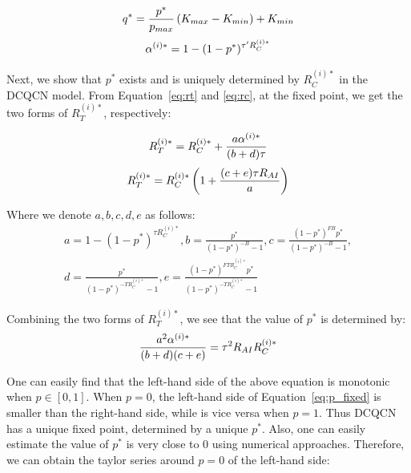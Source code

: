 \begin{equation}
\small
{q^*} = \frac{{{p^*}}}{{{p_{max}}}}\left( {{K_{max}} - {K_{min}}} \right) + {K_{min}}
\end{equation}
\begin{equation}
\small
\alpha^{(i)*}  = 1 - {(1 - p^*)^{{\tau '}R_C^{(i)*}}}
\end{equation}

Next, we show that $p^*$ exists and is uniquely determined by $R_C^{(i)*}$ in the DCQCN model. 
From Equation~\ref{eq:rt} and \ref{eq:rc}, at the fixed point, we get the two forms of $R_T^{(i)*}$, respectively:

\begin{equation}
\small
{R_T^{(i)*}} = R_C^{(i)*} + \frac{{a\alpha^{(i)*} }}{{(b + d)\tau }}
\end{equation}
\begin{equation}
\small
{R_T^{(i)*}} = R_C^{(i)*}\left( {1 + \frac{{(c + e)\tau {R_{AI}}}}{a}} \right)
\end{equation}

Where we denote $a, b, c, d, e$ as follows:
\begin{equation}
\begin{array}{l}
a = 1 - {(1 - p^*)^{\tau {R_C^{(i)*}}}},b = \frac{{p^*}}{{{{(1 - p^*)}^{ - B}} - 1}},c = \frac{{{{(1 - p^*)}^{FB}}p^*}}{{{{(1 - p^*)}^{ - B}} - 1}},\\
d = \frac{{p^*}}{{{{(1 - p^*)}^{ - T{R_C^{(i)*}}}} - 1}},e = \frac{{{{(1 - p^*)}^{FT{R_C^{(i)*}}}}p^*}}{{{{(1 - p^*)}^{ - T{R_C^{(i)*}}}} - 1}}
\end{array}
\end{equation}

Combining the two forms of $R_T^{(i)*}$, we see that the value of $p^*$ is determined by:
\begin{equation}
\small
\frac{{{a^2}\alpha^{(i)*} }}{{(b + d)(c + e)}} = {\tau ^2}{R_{AI}}R_C^{(i)*}
\label{eq:p_fixed}
\end{equation}

One can easily find that the left-hand side of the above equation is monotonic when $p \in [0,1]$.
When $p = 0$, the left-hand side of Equation~\ref{eq:p_fixed} is smaller than the right-hand side,
while is vice versa when $p = 1$. Thus DCQCN has a unique fixed point, determined by a unique $p^*$. 
Also, one can easily estimate the value of $p^*$ is very 
close to 0 using numerical approaches. Therefore, we can obtain the taylor series around $p=0$ of the left-hand side:


